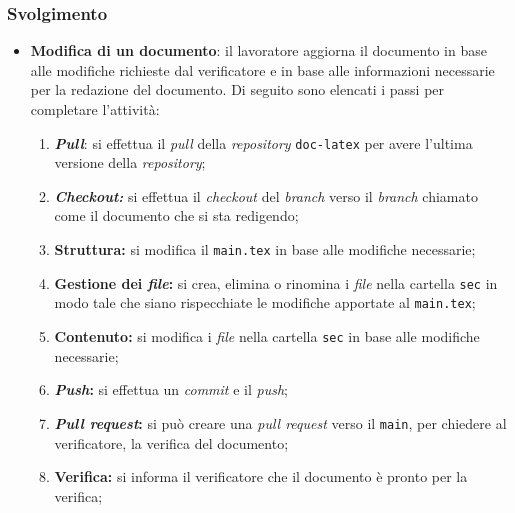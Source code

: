 \subsubsection{Svolgimento}
\begin{itemize}
	\item \textbf{Modifica di un documento}: il lavoratore aggiorna il documento
	      in base alle modifiche richieste dal verificatore e in base alle
	      informazioni necessarie per la redazione del documento. Di seguito sono
	      elencati i passi per completare l'attività:
	      \begin{enumerate}
		      \item \textbf{\textit{Pull}}: si effettua il \textit{pull}
		            della \textit{repository\g} \texttt{doc-latex} per avere
		            l'ultima versione della \textit{repository\g};

		      \item \textbf{\textit{Checkout:}} si effettua il
		            \textit{checkout} del \textit{branch} verso il
		            \textit{branch} chiamato come il documento che si sta
		            redigendo;

		      \item \textbf{Struttura:} si modifica il
		            \texttt{main.tex} in base alle modifiche necessarie;

		      \item \textbf{Gestione dei \textit{file}:} si crea,
		            elimina o rinomina i \textit{file} nella cartella
		            \texttt{sec} in modo tale che siano rispecchiate le
		            modifiche apportate al \texttt{main.tex};

		      \item \textbf{Contenuto:} si modifica i \textit{file}
		            nella cartella \texttt{sec} in base alle modifiche
		            necessarie;

		      \item \textbf{\textit{Push}:} si effettua un
		            \textit{commit} e il \textit{push};

		      \item \textbf{\textit{Pull request}:} si può creare
		            una \textit{pull request} verso il \texttt{main},
		            per chiedere al verificatore, la verifica del documento;

		      \item \textbf{Verifica:} si informa il verificatore
		            che il documento è pronto per la verifica;


\end{enumerate}
\end{itemize}

